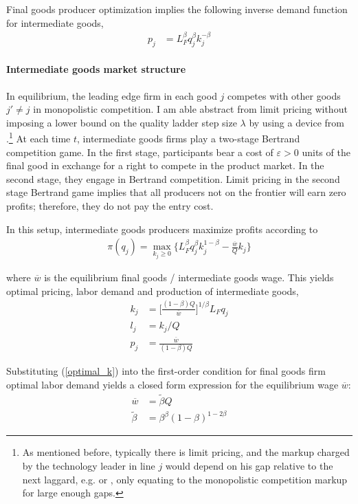 \documentclass[12pt,english]{article}
\theoremstyle{remark}
\begin{document}
Final goods producer optimization implies the following inverse demand function for intermediate goods, 
\begin{align*}
p_j &= L_F^{\beta} q_j^{\beta} k_j^{-\beta}	
\end{align*}

\paragraph{Intermediate goods market structure} In equilibrium, the leading edge firm in each good $j$ competes with other goods $j' \ne j$ in monopolistic competition. I am able abstract from limit pricing without imposing a lower bound on the quality ladder step size $\lambda$ by using a device from \cite{akcigit_growth_2018}.\footnote{As mentioned before, typically there is limit pricing, and the markup charged by the technology leader in line $j$ would depend on his gap relative to the next laggard, e.g. \cite{baslandze_spinout_2019} or \cite{aghion_competition_2005}, only equating to the monopolistic competition markup for large enough gaps.} At each time $t$, intermediate goods firms play a two-stage Bertrand competition game. In the first stage, participants bear a cost of $\varepsilon > 0$ units of the final good in exchange for a right to compete in the product market. In the second stage, they engage in Bertrand competition. Limit pricing in the second stage Bertrand game implies that all producers not on the frontier will earn zero profits; therefore, they do not pay the entry cost. 

In this setup, intermediate goods producers maximize profits according to
\begin{align}
\pi(q_j) = \max_{k_j \ge 0} \Big\{ L_F^{\beta} q_j^{\beta} k_j^{1-\beta} - \frac{\overline{w}}{Q} k_j \Big\} \label{incumbent_profit}
\end{align}

where $\overline{w}$ is the equilibrium final goods / intermediate goods wage.
This yields optimal pricing, labor demand and production of intermediate goods,
\begin{align}
k_j &= \Big[ \frac{(1-\beta) Q}{\overline{w}} \Big]^{1/\beta}L_F q_j  \label{optimal_k}\\
l_j &= k_j / Q \label{optimal_l}\\
p_j &= \frac{\overline{w}}{(1-\beta) Q} \label{optimal_p}
\end{align}

Substituting (\ref{optimal_k}) into the first-order condition for final goods firm optimal labor demand yields a closed form expression for the equilibrium wage $\overline{w}$:
\begin{align}
\overline{w} &= \tilde{\beta} Q \label{wbar} \\
\tilde{\beta} &= \beta^{\beta} (1-\beta)^{1-2\beta} \label{def_cbeta}
\end{align}
\end{document}
